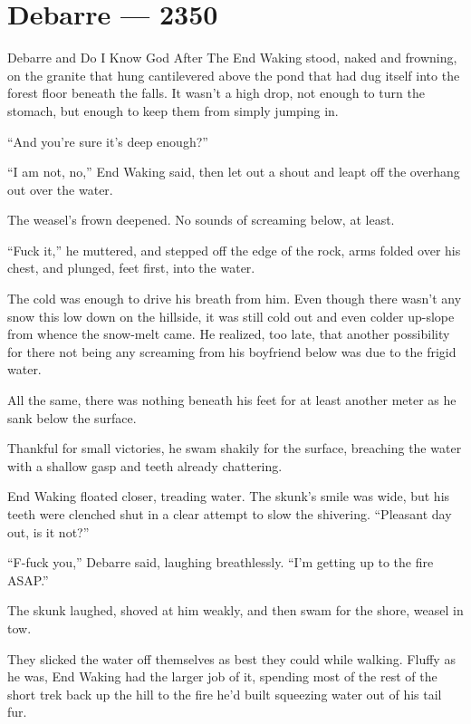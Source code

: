 \hypertarget{debarre-2350}{%
\chapter{Debarre — 2350}\label{debarre-2350}}

Debarre and Do I Know God After The End Waking stood, naked and frowning, on the granite that hung cantilevered above the pond that had dug itself into the forest floor beneath the falls. It wasn't a high drop, not enough to turn the stomach, but enough to keep them from simply jumping in.

``And you're sure it's deep enough?''

``I am not, no,'' End Waking said, then let out a shout and leapt off the overhang out over the water.

The weasel's frown deepened. No sounds of screaming below, at least.

``Fuck it,'' he muttered, and stepped off the edge of the rock, arms folded over his chest, and plunged, feet first, into the water.

The cold was enough to drive his breath from him. Even though there wasn't any snow this low down on the hillside, it was still cold out and even colder up-slope from whence the snow-melt came. He realized, too late, that another possibility for there not being any screaming from his boyfriend below was due to the frigid water.

All the same, there was nothing beneath his feet for at least another meter as he sank below the surface.

Thankful for small victories, he swam shakily for the surface, breaching the water with a shallow gasp and teeth already chattering.

End Waking floated closer, treading water. The skunk's smile was wide, but his teeth were clenched shut in a clear attempt to slow the shivering. ``Pleasant day out, is it not?''

``F-fuck you,'' Debarre said, laughing breathlessly. ``I'm getting up to the fire ASAP.''

The skunk laughed, shoved at him weakly, and then swam for the shore, weasel in tow.

They slicked the water off themselves as best they could while walking. Fluffy as he was, End Waking had the larger job of it, spending most of the rest of the short trek back up the hill to the fire he'd built squeezing water out of his tail fur.

